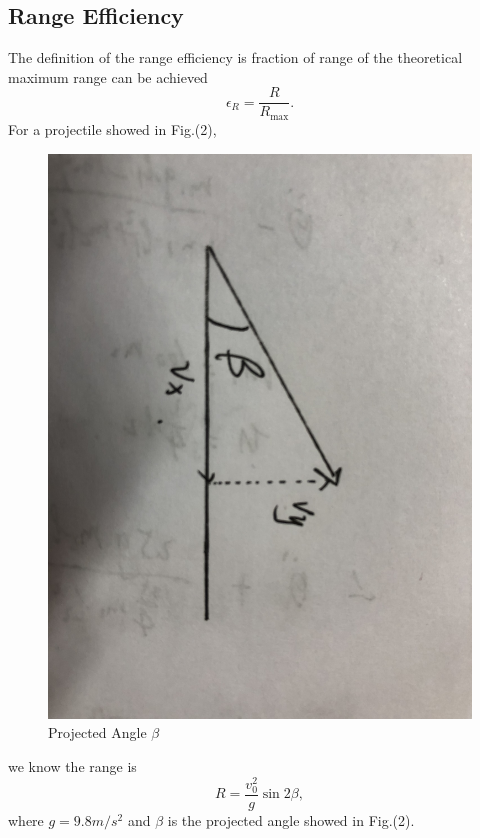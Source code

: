 \documentclass[%
reprint,
amsmath,amssymb,
aps,
]{revtex4-1}
\begin{document}
	\subsection{Range Efficiency}
	The definition of the range efficiency is  fraction of range of the
	theoretical maximum range can be achieved
	\begin{equation}
	\epsilon_R=\frac{R}{R_{\mathrm{max}}}.
	\end{equation}
	For a projectile showed in Fig.(2), 
	\begin{figure}
		\centering
		\includegraphics[scale=0.05]{ProjectedAngle.jpg}
		\caption{Projected Angle $\beta$}
	\end{figure}
	we know the range is 
	\begin{equation}
	R=\frac{v_0^2}{g}\sin{2\beta},
	\label{rangeofprojection}
	\end{equation}
	where $g=9.8m/s^2$ and $\beta$ is the projected angle showed in Fig.(2).
	
\end{document}
